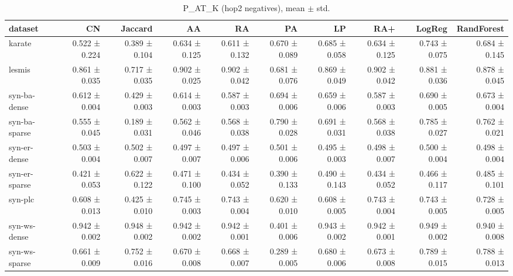 \begin{table}[t]
\centering
\caption{P_AT_K (hop2 negatives), mean $\pm$ std.}
\label{tab:main_p_at_k_hop2}
\begin{tabular}{lrrrrrrrrr}
\hline
dataset & CN & Jaccard & AA & RA & PA & LP & RA+ & LogReg & RandForest \\
\hline
karate & 0.522 ± 0.224 & 0.389 ± 0.104 & 0.634 ± 0.125 & 0.611 ± 0.132 & 0.670 ± 0.089 & 0.685 ± 0.058 & 0.634 ± 0.125 & 0.743 ± 0.075 & 0.684 ± 0.145 \\
lesmis & 0.861 ± 0.035 & 0.717 ± 0.035 & 0.902 ± 0.025 & 0.902 ± 0.042 & 0.681 ± 0.076 & 0.869 ± 0.049 & 0.902 ± 0.042 & 0.881 ± 0.036 & 0.878 ± 0.045 \\
syn-ba-dense & 0.612 ± 0.004 & 0.429 ± 0.003 & 0.614 ± 0.003 & 0.587 ± 0.003 & 0.694 ± 0.006 & 0.659 ± 0.006 & 0.587 ± 0.003 & 0.690 ± 0.005 & 0.673 ± 0.004 \\
syn-ba-sparse & 0.555 ± 0.045 & 0.189 ± 0.031 & 0.562 ± 0.046 & 0.568 ± 0.038 & 0.790 ± 0.028 & 0.691 ± 0.031 & 0.568 ± 0.038 & 0.785 ± 0.027 & 0.762 ± 0.021 \\
syn-er-dense & 0.503 ± 0.004 & 0.502 ± 0.007 & 0.497 ± 0.007 & 0.497 ± 0.006 & 0.501 ± 0.006 & 0.495 ± 0.003 & 0.498 ± 0.007 & 0.500 ± 0.004 & 0.498 ± 0.004 \\
syn-er-sparse & 0.421 ± 0.053 & 0.622 ± 0.122 & 0.471 ± 0.100 & 0.434 ± 0.052 & 0.390 ± 0.133 & 0.490 ± 0.143 & 0.434 ± 0.052 & 0.466 ± 0.117 & 0.485 ± 0.101 \\
syn-plc & 0.608 ± 0.013 & 0.425 ± 0.010 & 0.745 ± 0.003 & 0.743 ± 0.004 & 0.620 ± 0.010 & 0.608 ± 0.005 & 0.743 ± 0.004 & 0.743 ± 0.005 & 0.728 ± 0.005 \\
syn-ws-dense & 0.942 ± 0.002 & 0.948 ± 0.002 & 0.942 ± 0.002 & 0.942 ± 0.001 & 0.401 ± 0.006 & 0.943 ± 0.002 & 0.942 ± 0.001 & 0.949 ± 0.002 & 0.940 ± 0.008 \\
syn-ws-sparse & 0.661 ± 0.009 & 0.752 ± 0.016 & 0.670 ± 0.008 & 0.668 ± 0.007 & 0.289 ± 0.005 & 0.680 ± 0.006 & 0.673 ± 0.008 & 0.789 ± 0.015 & 0.788 ± 0.013 \\
\hline
\end{tabular}
\end{table}
